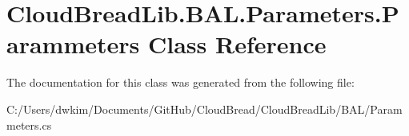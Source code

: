 \hypertarget{class_cloud_bread_lib_1_1_b_a_l_1_1_parameters_1_1_parammeters}{}\section{Cloud\+Bread\+Lib.\+B\+A\+L.\+Parameters.\+Parammeters Class Reference}
\label{class_cloud_bread_lib_1_1_b_a_l_1_1_parameters_1_1_parammeters}


The documentation for this class was generated from the following file\+:\begin{DoxyCompactItemize}
\item 
C\+:/\+Users/dwkim/\+Documents/\+Git\+Hub/\+Cloud\+Bread/\+Cloud\+Bread\+Lib/\+B\+A\+L/Parammeters.\+cs\end{DoxyCompactItemize}
